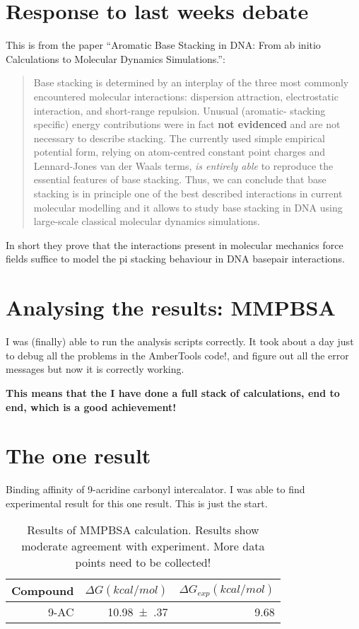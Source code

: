 \documentclass{article}
\begin{document}
\section{Response to last weeks debate}

This is from the paper ``Aromatic Base Stacking in DNA: From ab initio Calculations to Molecular Dynamics Simulations.'':

\begin{quotation}
Base stacking is determined by an interplay of the three most commonly encountered molecular interactions: dispersion attraction, electrostatic interaction, and short-range repulsion. Unusual (aromatic- stacking specific) energy contributions were in fact \textbf{not evidenced} and are not necessary to describe stacking. The currently used simple empirical potential form, relying on atom-centred constant point charges and Lennard-Jones van der Waals terms, \emph{is entirely able} to reproduce the essential features of base stacking. Thus, we can conclude that base stacking is in principle one of the best described interactions in current molecular modelling and it allows to study base stacking in DNA using large-scale classical molecular dynamics simulations.
\end{quotation}

In short they prove that the interactions present in molecular mechanics force fields suffice to model the pi stacking behaviour in DNA basepair interactions.

\section{Analysing the results: MMPBSA}

I was (finally) able to run the analysis scripts correctly. It took about a day just to debug all the problems in the AmberTools code!, and figure out all the error messages but now it is correctly working. 

\textbf{This means that the I have done a full stack of calculations, end to end, which is a good achievement!}

\section{The one result}

Binding affinity of 9-acridine carbonyl intercalator. I was able to find experimental result for this one result. This is just the start. 

\begin{table}[h]
  \caption{Results of MMPBSA calculation. Results show moderate agreement with experiment. More data points need to be collected!}
  \label{tab:res}
  \begin{tabular}{rrr}
    \toprule
    Compound & $\Delta G (kcal/mol)$ & $\Delta G_{exp} (kcal/mol)$ \\
    \midrule
    9-AC & \num{10.98(37)} & \num{9.68} \\
    \bottomrule
  \end{tabular}
\end{table}
\end{document}
